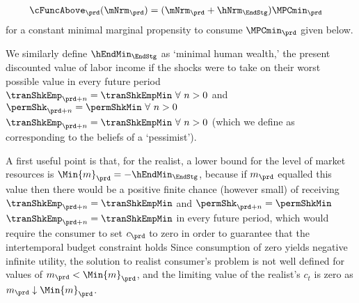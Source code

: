 \documentclass[titlepage, headings=optiontotocandhead]{econark}
\makeatletter
\newcommand{\saferlabel}[1]{%
  \ifcsname r@#1\endcsname
  \else
    \label{#1}%
  \fi
}
\makeatother
\begin{document}
  \begin{equation}\begin{gathered}\begin{aligned}
        \cFuncAbove_{\prd}(\mNrm_{\prd})  & = (\mNrm_{\prd} + \hNrm_{\EndStg})\MPCmin_{\prd} \saferlabel{eq:cFuncAbove} %
      \end{aligned}\end{gathered}\end{equation}
  for a constant minimal marginal propensity to consume $\MPCmin_{\prd}$ given below.



  We similarly define $\hEndMin_{\EndStg}$ as `minimal human wealth,' the
  present discounted value of labor income if the shocks were to take on
  their worst possible value in every future period \PermShkOn
  {$\tranShkEmp_{\prd+n} = \tranShkEmpMin ~\forall~n>0$ and $\permShk_{\prd+n} =
    \permShkMin ~\forall~n>0$} {$\tranShkEmp_{\prd+n} = \tranShkEmpMin
    ~\forall~n>0$} (which we define as corresponding to the beliefs of a
  `pessimist').


  A first useful point is that, for the realist, a lower bound for the
  level of market resources is $\Min{m}_{\prd} = -\hEndMin_{\EndStg}$, because
  if $m_{\prd}$ equalled this value then there would be a positive finite
  chance (however small) of receiving \PermShkOn
  {$\tranShkEmp_{\prd+n}=\tranShkEmpMin$ and $\permShk_{\prd+n}=\permShkMin$}
  {$\tranShkEmp_{\prd+n}=\tranShkEmpMin$}
  in
  every future period, which would require the consumer to set $c_{\prd}$
  to zero in order to guarantee that the intertemporal budget constraint
  holds  Since consumption of zero yields negative
  infinite utility, the solution to realist consumer's problem is not well
  defined for values of $m_{\prd} < \Min{m}_{\prd}$, and the limiting
  value of the realist's $c_t$ is zero as $m_{\prd} \downarrow \Min{m}_{\prd}$.
\end{document}
